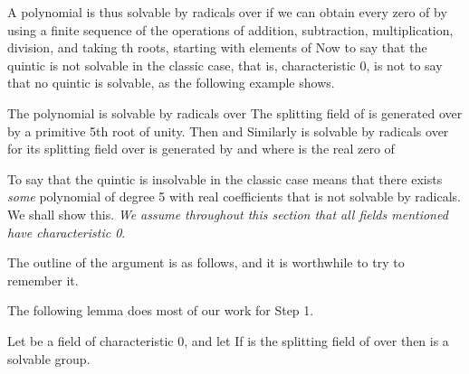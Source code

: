 \documentclass[11pt,oneside]{article}
\begin{document}
\begin{BookBody}
A polynomial  is thus solvable by radicals over  if we can obtain every zero of  by using a finite sequence of the operations of addition, subtraction, multiplication, division, and taking th roots, starting with elements of  Now to say that the quintic is not solvable in the classic case, that is, characteristic 0, is not to say that no quintic is solvable, as the following example shows.

 The polynomial  is solvable by radicals over  The splitting field  of  is generated over  by a primitive 5th root \BookInline{\zeta } of unity. Then  and  Similarly is solvable by radicals over  for its splitting field over  is generated by  and \BookInline{\zeta,\allowbreak } where  is the real zero of \BookEnd{\blacktriangle}

To say that the quintic is insolvable in the classic case means that there exists\textit{ some} polynomial of degree 5 with real coefficients that is not solvable by radicals. We shall show this.\textit{ We assume throughout this section that all fields mentioned have character}\textit{istic 0}.

The outline of the argument is as follows, and it is worthwhile to try to remember it.



\noindent The following lemma does most of our work for Step 1.

 Let  be a field of characteristic 0, and let  If  is the splitting field of  over  then  is a solvable group.

\end{BookBody}
\end{document}
